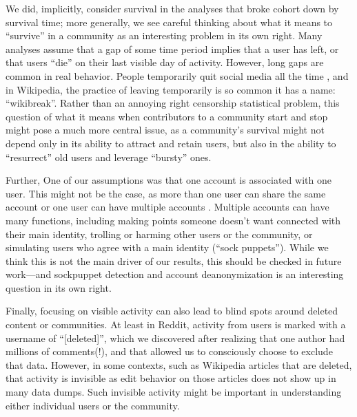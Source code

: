 We did, implicitly, consider survival in the analyses that broke cohort down by survival time; more generally, we see careful thinking about what it means to ``survive'' in a community as an interesting problem in its own right.  Many analyses assume that a gap of some time period implies that a user has left, or that users ``die'' on their last visible day of activity.  However, long gaps are common in real behavior.  People temporarily quit social media all the time \cite{Baumer2013}, and in Wikipedia, the practice of leaving temporarily is so common it has a name: ``wikibreak''.    Rather than an annoying right censorship statistical problem, this question of what it means when contributors to a community start and stop might pose a much more central issue, as a community's survival might not depend only in its ability to attract and retain users, but also in the ability to ``resurrect'' old users and leverage ``bursty'' ones.


Further, One of our assumptions was that one account is associated with one user. This might not be the case, as more than one user can share the same account \cite{Lampinen2014} or one user can have multiple accounts \cite{Bergstrom2011}.  Multiple accounts can have many functions, including making points someone doesn't want connected with their main identity, trolling or harming other users or the community, or simulating users who agree with a main identity (``sock puppets'').  While we think this is not the main driver of our results, this should be checked in future work---and sockpuppet detection and account deanonymization is an interesting question in its own right.

Finally, focusing on visible activity can also lead to blind spots around deleted content or communities.  At least in Reddit, activity from users is marked with a username of ``[deleted]'', which we discovered after realizing that one author had millions of comments(!), and that allowed us to consciously choose to exclude that data.  However, in some contexts, such as Wikipedia articles that are deleted, that activity is invisible as edit behavior on those articles does not show up in many data dumps.  Such invisible activity might be important in understanding either individual users or the community. 

